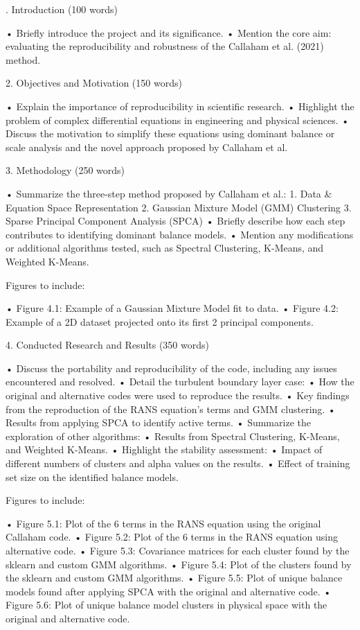 . Introduction (100 words)

	•	Briefly introduce the project and its significance.
	•	Mention the core aim: evaluating the reproducibility and robustness of the Callaham et al. (2021) method.

2. Objectives and Motivation (150 words)

	•	Explain the importance of reproducibility in scientific research.
	•	Highlight the problem of complex differential equations in engineering and physical sciences.
	•	Discuss the motivation to simplify these equations using dominant balance or scale analysis and the novel approach proposed by Callaham et al.

3. Methodology (250 words)

	•	Summarize the three-step method proposed by Callaham et al.:
	1.	Data & Equation Space Representation
	2.	Gaussian Mixture Model (GMM) Clustering
	3.	Sparse Principal Component Analysis (SPCA)
	•	Briefly describe how each step contributes to identifying dominant balance models.
	•	Mention any modifications or additional algorithms tested, such as Spectral Clustering, K-Means, and Weighted K-Means.

Figures to include:

	•	Figure 4.1: Example of a Gaussian Mixture Model fit to data.
	•	Figure 4.2: Example of a 2D dataset projected onto its first 2 principal components.

4. Conducted Research and Results (350 words)

	•	Discuss the portability and reproducibility of the code, including any issues encountered and resolved.
	•	Detail the turbulent boundary layer case:
	•	How the original and alternative codes were used to reproduce the results.
	•	Key findings from the reproduction of the RANS equation’s terms and GMM clustering.
	•	Results from applying SPCA to identify active terms.
	•	Summarize the exploration of other algorithms:
	•	Results from Spectral Clustering, K-Means, and Weighted K-Means.
	•	Highlight the stability assessment:
	•	Impact of different numbers of clusters and alpha values on the results.
	•	Effect of training set size on the identified balance models.

Figures to include:

	•	Figure 5.1: Plot of the 6 terms in the RANS equation using the original Callaham code.
	•	Figure 5.2: Plot of the 6 terms in the RANS equation using alternative code.
	•	Figure 5.3: Covariance matrices for each cluster found by the sklearn and custom GMM algorithms.
	•	Figure 5.4: Plot of the clusters found by the sklearn and custom GMM algorithms.
	•	Figure 5.5: Plot of unique balance models found after applying SPCA with the original and alternative code.
	•	Figure 5.6: Plot of unique balance model clusters in physical space with the original and alternative code.

